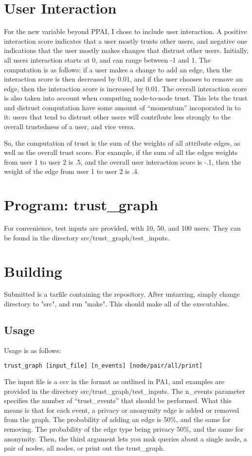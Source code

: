 \documentclass{article}
\begin{document}
\section{User Interaction}
For the new variable beyond PPAI, I chose to include user interaction. A positive 
interaction score indicates that a user mostly trusts other users, and negative one
indications that the user mostly makes changes that distrust other users. Initially, 
all users interaction starts at 0, and can range between -1 and 1. The computation is
as follows: if a user makes a change to add an edge, then the interaction score is
then decreased by 0.01, and if the user chooses to remove an edge, then the 
interaction score is increased by 0.01. The overall interaction score is also 
taken into account when computing node-to-node trust. This lets the trust and distrust
computation have some amount of ``momentum'' incoporated in to it: users that tend to
distrust other users will contribute less strongly to the overall trustedness of a 
user, and vice versa. 

So, the computation of trust is the sum of the weights of all attribute edges, 
as well as the overall trust score. For example, if the sum of all the edges
weights from user 1 to user 2 is .5, and the overall user interaction score is -.1, then the weight of the edge from user 1 to user 2 is .4.

\section{Program: trust\_graph}
For convenience, test inputs are provided, with 10, 50, and 100 users. They can be 
found in the directory src/trust\_graph/test\_inputs. 

\section{Building}                                                              
Submitted is a tarfile containing the repository. After untarring, simply       
change directory to "src", and run "make". This should make all of the executables.   

\subsection{Usage}
Usage is as follows: 
\begin{verbatim}
trust_graph [input_file] [n_events] [node/pair/all/print]
\end{verbatim}
The input file is a csv in the format as outlined in PA1, and examples are provided 
in the directory src/trust\_graph/test\_inputs. The n\_events parameter specifies the 
number of ``trust\_events'' that should be performed. What this means is that for
each event, a privacy or anonymity edge is added or removed from the graph. The 
probability of adding an edge is 50\%, and the same for removing. The probability of
the edge type being privacy 50\%, and the same for anonymity. Then, the third 
argument lets you mak queries about a single node, a pair of nodes, all nodes, 
or print out the trust\_graph. 
\end{document}
